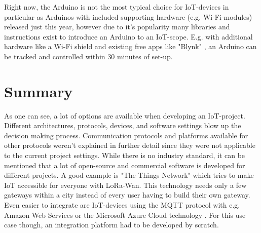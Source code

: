 Right now, the Arduino is not the most typical choice for IoT-devices in particular as Arduinos 
with included supporting hardware (e.g. Wi-Fi-modules) released just this year,
however due to it's popularity many libraries and instructions exist to introduce an Arduino to an IoT-scope.
E.g. with additional hardware like a Wi-Fi shield and existing free apps like "Blynk"  \parencite{blynk}, 
an Arduino can be tracked and controlled within 30 minutes of set-up.

\section{Summary}
As one can see, a lot of options are available when developing an IoT-project.
Different architectures, protocols, devices, and software settings blow up the decision making process.
Communication protocols and platforms available for other protocols weren't explained in further detail since they were not applicable to the current project settings.
While there is no industry standard, it can be mentioned that a lot of open-source and commercial software is developed for different projects.
A good example is "The Things Network" \parencite{ttn} which tries to make IoT accessible for everyone with LoRa-Wan.
This technology needs only a few gateways within a city instead of every user having to build their own gateway.
Even easier to integrate are IoT-devices using the MQTT protocol with e.g. Amazon Web Services \parencite{awsIOT} or the Microsoft Azure Cloud technology \parencite{msIOT}.
For this use case though, an integration platform had to be developed by scratch.

